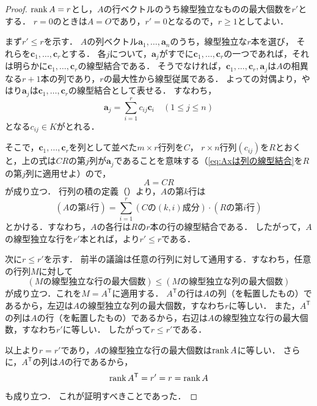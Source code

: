 \begin{tleftbar}
\begin{proof}
  $\operatorname{rank} A = r$とし，$A$の行ベクトルのうち線型独立なものの最大個数を$r'$とする．
  $r = 0$のときは$A = O$であり，$r' = 0$となるので，$r \ge 1$としてよい．

  まず$r' \le r$を示す．
  $A$の列ベクトル$\bm{a}_1, \dots, \bm{a}_n$のうち，線型独立な$r$本を選び，
  それらを$\bm{c}_1, \dots, \bm{c}_r$とする．
  各$j$について，$\bm{a}_j$がすでに$\bm{c}_1, \dots, \bm{c}_r$の一つであれば，それは明らかに$\bm{c}_1, \dots, \bm{c}_r$の線型結合である．
  そうでなければ，$\bm{c}_1, \dots, \bm{c}_r, \bm{a}_j$は$A$の相異なる$r + 1$本の列であり，$r$の最大性から線型従属である．
  よっての対偶より，やはり$\bm{a}_j$は$\bm{c}_1, \dots, \bm{c}_r$の線型結合として表せる．
  すなわち，
  \[
    \bm{a}_j = \sum_{i=1}^{r} c_{ij} \bm{c}_i \quad (1 \le j \le n)
  \]
  となる$c_{ij} \in K$がとれる．

  そこで，$\bm{c}_1, \dots, \bm{c}_r$を列として並べた$m \times r$行列を$C$，
  $r \times n$行列$(c_{ij})$を$R$とおくと，上の式は$CR$の第$j$列が$\bm{a}_j$であることを意味する（\eqref{eq:Axは列の線型結合}を$R$の第$j$列に適用せよ）ので，
  \[
    A = CR
  \]
  が成り立つ．
  行列の積の定義（）より，$A$の第$k$行は
  \[
    (\text{$A$の第$k$行}) = \sum_{i=1}^{r} (\text{$C$の$(k,i)$成分}) \cdot (\text{$R$の第$i$行})
  \]
  とかける．すなわち，$A$の各行は$R$の$r$本の行の線型結合である．
  したがって，$A$の線型独立な行を$r'$本とれば，より$r' \le r$である．

  次に$r \le r'$を示す．
  前半の議論は任意の行列に対して通用する．すなわち，任意の行列$M$に対して
  \[
    (\text{$M$の線型独立な行の最大個数})
    \le
    (\text{$M$の線型独立な列の最大個数})
  \]
  が成り立つ．これを$M = A^\mathsf{T}$に適用する．
  $A^\mathsf{T}$の行は$A$の列（を転置したもの）であるから，左辺は$A$の線型独立な列の最大個数，すなわち$r$に等しい．
  また，$A^\mathsf{T}$の列は$A$の行（を転置したもの）であるから，右辺は$A$の線型独立な行の最大個数，すなわち$r'$に等しい．
  したがって$r \le r'$である．

  以上より$r = r'$であり，$A$の線型独立な行の最大個数は$\operatorname{rank} A$に等しい．
  さらに，$A^\mathsf{T}$の列は$A$の行であるから，
  \[
    \operatorname{rank} A^\mathsf{T} = r' = r = \operatorname{rank} A
  \]
  も成り立つ．
  これが証明すべきことであった．
\end{proof}
\end{tleftbar}

